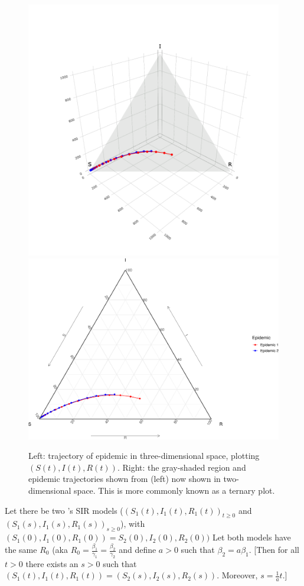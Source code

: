 \documentclass[
  shortnames]{jss}
\begin{document}
\begin{CodeChunk}
\begin{figure}[H]

{\centering \includegraphics[width=0.49\linewidth]{images/vis3d} \includegraphics[width=0.49\linewidth]{Figs/unnamed-chunk-3-2} 

}

\caption{\label{fig:different-scales-tern}Left: trajectory of epidemic in three-dimensional space, plotting $(S(t), I(t), R(t))$.  Right: the gray-shaded region and epidemic trajectories shown from (left) now shown in two-dimensional space.  This is more commonly known as a ternary plot.}\label{fig:unnamed-chunk-3}
\end{figure}
\end{CodeChunk}

\begin{theorem}\label{thm:sir-scale}
 Let there be two \citet{Kermack1927}'s SIR models ($(S_1(t),I_1(t),R_1(t))_{t\geq 0}$ and $(S_1(s),I_1(s),R_1(s))_{s\geq 0}$), with $(S_1(0),I_1(0),R_1(0))=S_2(0),I_2(0),R_2(0))$  Let both models have the same $R_0$ (aka $R_0 = \frac{\beta_1}{\gamma_1} = \frac{\beta_2}{\gamma_2}$ and define $a > 0$ such that $\beta_2 = a\beta_1$. [Then for all $t > 0$ there exists an $s>0$ such that $(S_1(t), I_1(t), R_1(t)) = (S_2(s), I_2(s), R_2(s))$.  Moreover, $s = \frac{1}{a}t$.]
\end{theorem}
\end{document}
